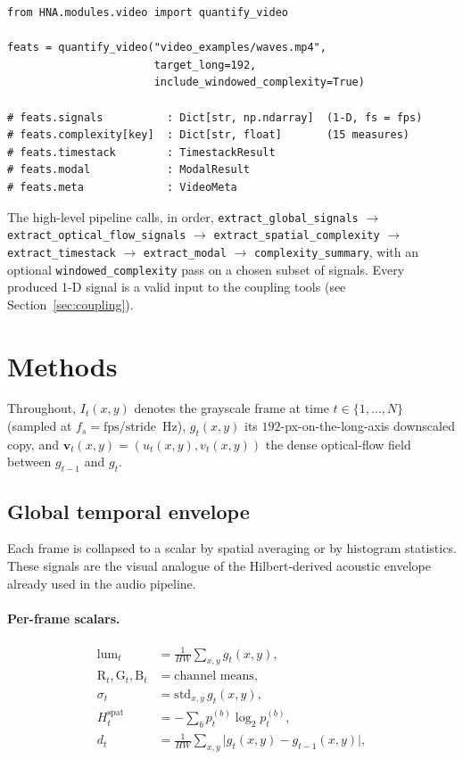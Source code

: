 \documentclass[11pt,a4paper]{article}
\newcommand{\code}[1]{\texttt{\small #1}}
\begin{document}
\begin{lstlisting}
from HNA.modules.video import quantify_video

feats = quantify_video("video_examples/waves.mp4",
                       target_long=192,
                       include_windowed_complexity=True)

# feats.signals          : Dict[str, np.ndarray]  (1-D, fs = fps)
# feats.complexity[key]  : Dict[str, float]       (15 measures)
# feats.timestack        : TimestackResult
# feats.modal            : ModalResult
# feats.meta             : VideoMeta
\end{lstlisting}

The high-level pipeline calls, in order, \code{extract\_global\_signals} $\to$
\code{extract\_optical\_flow\_signals} $\to$ \code{extract\_spatial\_complexity}
$\to$ \code{extract\_timestack} $\to$ \code{extract\_modal} $\to$
\code{complexity\_summary}, with an optional \code{windowed\_complexity}
pass on a chosen subset of signals. Every produced 1-D signal is a valid
input to the coupling tools (see Section~\ref{sec:coupling}).

\section{Methods}\label{sec:methods}

Throughout, $I_t(x,y)$ denotes the grayscale frame at time $t \in
\{1,\dots,N\}$ (sampled at $f_s = \mathrm{fps}/\mathrm{stride}$~Hz),
$g_t(x,y)$ its $192$-px-on-the-long-axis downscaled copy, and
$\mathbf{v}_t(x,y) = (u_t(x,y),v_t(x,y))$ the dense optical-flow field
between $g_{t-1}$ and $g_t$.

\subsection{Global temporal envelope}

Each frame is collapsed to a scalar by spatial averaging or by histogram
statistics. These signals are the visual analogue of the Hilbert-derived
acoustic envelope already used in the audio pipeline.

\paragraph{Per-frame scalars.}
\begin{align}
  \mathrm{lum}_t      &= \tfrac{1}{HW}\textstyle\sum_{x,y} g_t(x,y), \\
  \mathrm{R}_t,\mathrm{G}_t,\mathrm{B}_t &= \text{channel means}, \\
  \sigma_t            &= \mathrm{std}_{x,y}\,g_t(x,y), \\
  H_t^{\text{spat}}   &= -\textstyle\sum_b p_t^{(b)} \log_2 p_t^{(b)}, \\
  d_t                 &= \tfrac{1}{HW}\textstyle\sum_{x,y} \bigl|g_t(x,y) - g_{t-1}(x,y)\bigr|,
\end{align}
\end{document}
